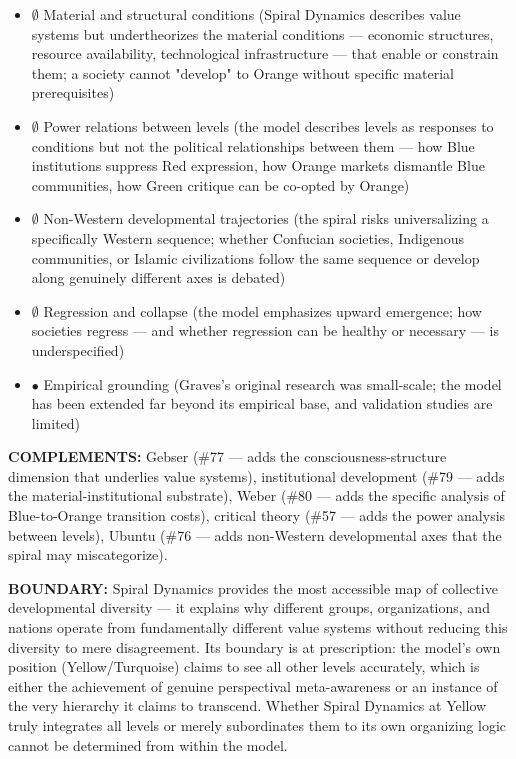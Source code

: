 \begin{itemize}[nosep,leftmargin=*]
  \item $\emptyset$ Material and structural conditions (Spiral Dynamics describes value systems but undertheorizes the material conditions — economic structures, resource availability, technological infrastructure — that enable or constrain them; a society cannot "develop" to Orange without specific material prerequisites)
  \item $\emptyset$ Power relations between levels (the model describes levels as responses to conditions but not the political relationships between them — how Blue institutions suppress Red expression, how Orange markets dismantle Blue communities, how Green critique can be co-opted by Orange)
  \item $\emptyset$ Non-Western developmental trajectories (the spiral risks universalizing a specifically Western sequence; whether Confucian societies, Indigenous communities, or Islamic civilizations follow the same sequence or develop along genuinely different axes is debated)
  \item $\emptyset$ Regression and collapse (the model emphasizes upward emergence; how societies regress — and whether regression can be healthy or necessary — is underspecified)
  \item $\bullet$ Empirical grounding (Graves's original research was small-scale; the model has been extended far beyond its empirical base, and validation studies are limited)
\end{itemize}


\textbf{COMPLEMENTS:} Gebser (\#77 — adds the consciousness-structure dimension that underlies value systems), institutional development (\#79 — adds the material-institutional substrate), Weber (\#80 — adds the specific analysis of Blue-to-Orange transition costs), critical theory (\#57 — adds the power analysis between levels), Ubuntu (\#76 — adds non-Western developmental axes that the spiral may miscategorize).


\textbf{BOUNDARY:} Spiral Dynamics provides the most accessible map of collective developmental diversity — it explains why different groups, organizations, and nations operate from fundamentally different value systems without reducing this diversity to mere disagreement. Its boundary is at prescription: the model's own position (Yellow/Turquoise) claims to see all other levels accurately, which is either the achievement of genuine perspectival meta-awareness or an instance of the very hierarchy it claims to transcend. Whether Spiral Dynamics at Yellow truly integrates all levels or merely subordinates them to its own organizing logic cannot be determined from within the model.


